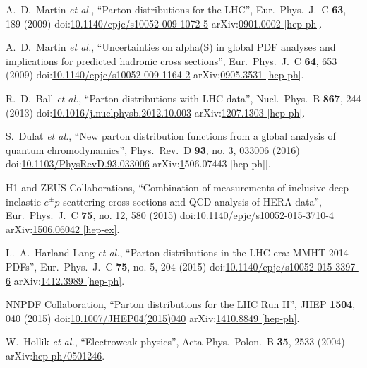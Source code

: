 \begin{thebibliography}{99}
A.~D.~Martin {\it et al.}, ``Parton distributions for the LHC'', Eur.\ Phys.\ J.\ C {\bf 63}, 189 (2009) doi:\href{http://dx.doi.org/10.1140/epjc/s10052-009-1072-5}{10.1140/epjc/s10052-009-1072-5} arXiv:\href{https://arxiv.org/abs/0901.0002}{0901.0002 [hep-ph]}.

A.~D.~Martin {\it et al.}, ``Uncertainties on alpha(S) in global PDF analyses and implications for predicted hadronic cross sections'', Eur.\ Phys.\ J.\ C {\bf 64}, 653 (2009) doi:\href{http://dx.doi.org/10.1140/epjc/s10052-009-1164-2}{10.1140/epjc/s10052-009-1164-2} arXiv:\href{https://arxiv.org/abs/0905.3531}{0905.3531 [hep-ph]}.

R.~D.~Ball {\it et al.}, ``Parton distributions with LHC data'', Nucl.\ Phys.\ B {\bf 867}, 244 (2013) doi:\href{http://dx.doi.org/10.1016/j.nuclphysb.2012.10.003}{10.1016/j.nuclphysb.2012.10.003} arXiv:\href{https://arxiv.org/abs/1207.1303}{1207.1303 [hep-ph]}.

S.~Dulat {\it et al.}, ``New parton distribution functions from a global analysis of quantum chromodynamics'', Phys.\ Rev.\ D {\bf 93}, no. 3, 033006 (2016) doi:\href{http://dx.doi.org/10.1103/PhysRevD.93.033006}{10.1103/PhysRevD.93.033006} arXiv:\href{https://arxiv.org/abs/1506.07443}1506.07443 [hep-ph]].

H1 and ZEUS Collaborations, ``Combination of measurements of inclusive deep inelastic ${e^{\pm }p}$ scattering cross sections and QCD analysis of HERA data'', Eur.\ Phys.\ J.\ C {\bf 75}, no. 12, 580 (2015) doi:\href{http://dx.doi.org/10.1140/epjc/s10052-015-3710-4}{10.1140/epjc/s10052-015-3710-4} arXiv:\href{https://arxiv.org/abs/1506.06042}{1506.06042 [hep-ex]}.

L.~A.~Harland-Lang {\it et al.}, ``Parton distributions in the LHC era: MMHT 2014 PDFs'', Eur.\ Phys.\ J.\ C {\bf 75}, no. 5, 204 (2015) doi:\href{http://dx.doi.org/10.1140/epjc/s10052-015-3397-6}{10.1140/epjc/s10052-015-3397-6} arXiv:\href{https://arxiv.org/abs/1412.3989}{1412.3989 [hep-ph]}.

NNPDF Collaboration, ``Parton distributions for the LHC Run II'', JHEP {\bf 1504}, 040 (2015) doi:\href{http://dx.doi.org/10.1007/JHEP04(2015)040}{10.1007/JHEP04(2015)040} arXiv:\href{https://arxiv.org/abs/1410.8849}{1410.8849 [hep-ph]}.

W.~Hollik {\it et al.}, ``Electroweak physics'', Acta Phys.\ Polon.\ B {\bf 35}, 2533 (2004) arXiv:\href{https://arxiv.org/abs/hep-ph/0501246}{hep-ph/0501246}.
 

\end{thebibliography}
